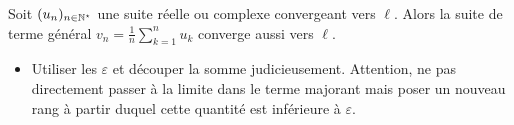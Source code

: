 \begin{tcolorbox}
    Soit $(u_n)_{n \in \mathbb{N}^\star}$ une suite réelle ou complexe convergeant vers $\ell$.
    Alors la suite de terme général $v_n = \frac{1}{n} \sum\limits_{k=1}^{n} u_k$ converge aussi vers $\ell$.
\end{tcolorbox}

\begin{itemize}
    \item Utiliser les $\varepsilon$ et découper la somme judicieusement. Attention, ne pas directement passer à la limite dans le terme majorant mais poser un nouveau rang à partir duquel cette quantité est inférieure à $\varepsilon$.
\end{itemize}